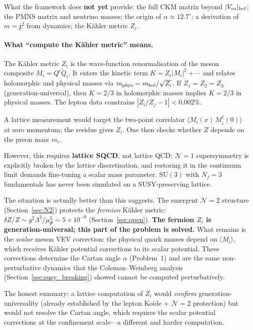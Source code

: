 \documentclass[12pt,a4paper]{article}
\newcommand{\SU}{\mathrm{SU}}
\newcommand{\Nf}{N_{\!f}}
\newcommand{\zch}{\mathfrak{z}}
\begin{document}
What the framework does \textbf{not yet} provide:
the full CKM matrix beyond $|V_{us}|_{\rm hol}$;
the PMNS matrix and neutrino masses;
the origin of $\alpha \approx 12.7^\circ$;
a derivation of $m = \zch^2$ from dynamics;
the K\"ahler metric $Z_i$.

\paragraph{What ``compute the K\"ahler metric'' means.}
The K\"ahler metric $Z_i$ is the wave-function renormalisation
of the meson composite $M_i = Q^i\tilde{Q}_i$.
It enters the kinetic term $K = Z_i|M_i|^2 + \cdots$ and
relates holomorphic and physical masses via
$m_{\rm phys} = m_{\rm hol}/\sqrt{Z_i}$.
If $Z_1 = Z_2 = Z_3$ (generation-universal), then $K = 2/3$ in
holomorphic masses implies $K = 2/3$ in physical masses.
The lepton data constrains $|Z_i/Z_j - 1| < 0.002\%$.

A lattice measurement would target the two-point correlator
$\langle M_i(x)\,M_i^\dagger(0)\rangle$ at zero momentum; the
residue gives $Z_i$.
One then checks whether $Z$ depends on the preon mass $m_i$.

However, this requires \textbf{lattice SQCD}, not lattice QCD:
$\mathcal{N}{=}1$ supersymmetry is explicitly broken by the lattice
discretisation, and restoring it in the continuum limit demands
fine-tuning a scalar mass parameter.
$\SU(3)$ with $\Nf = 3$ fundamentals has never been simulated
on a SUSY-preserving lattice.

The situation is actually better than this suggests.
The emergent $\mathcal{N}{=}2$ structure
(Section~\ref{sec:N2}) protects the \emph{fermion} K\"ahler
metric: $\delta Z/Z \sim g^2\Lambda^2/\mu_\Phi^2
\sim 5 \times 10^{-9}$ (Section~\ref{sec:open}).
\textbf{The fermion $Z_i$ is generation-universal; this part of
the problem is solved.}
What remains is the \emph{scalar} meson VEV correction:
the physical quark masses depend on $\langle M_i\rangle$, which
receives K\"ahler potential corrections to its scalar potential.
These corrections determine the Cartan angle $\alpha$
(Problem~1) and are the same non-perturbative dynamics that
the Coleman--Weinberg analysis (Section~\ref{sec:susy_breaking})
showed cannot be computed perturbatively.

The honest summary: a lattice computation of $Z_i$ would
\emph{confirm} generation-universality (already established by
the lepton Koide + $\mathcal{N}{=}2$ protection) but would not
resolve the Cartan angle, which requires the scalar potential
corrections at the confinement scale---a different and harder
computation.
\end{document}
